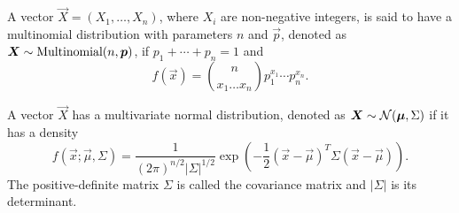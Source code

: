 \documentclass{article}
\begin{document}
\begin{defn}\label{c2d19}
A vector $\vec{X} = (X_1, \ldots, X_n)$, where $X_i$ are non-negative integers,
is said to have a multinomial distribution with parameters $n$ and $\vec{p}$,
denoted as $\bm{X} \sim \text{Multinomial}(n, \bm{p})$, if $p_1 + \cdots + p_n = 1$ and 
\begin{equation}\label{c2e25}
f(\vec{x}) = \binom{n}{x_1 \ldots x_n}p_1^{x_1}\cdots p_n^{x_n}.
\end{equation}
\end{defn}

\begin{defn}\label{c2d20}
A vector $\vec{X}$ has a multivariate normal distribution, denoted as $\bm{X}
\sim \mathcal{N}(\bm{\mu}, \Sigma)$ if it has a density
\begin{equation}\label{c2e26}
f(\vec{x}; \vec{\mu}, \Sigma) = \frac{1}{(2\pi)^{n/2}|\Sigma|^{1/2}}
\exp\left(-\frac{1}{2}(\vec{x} - \vec{\mu})^T\Sigma(\vec{x} - \vec{\mu})\right).
\end{equation}
The positive-definite matrix $\Sigma$ is called the covariance matrix and 
$|\Sigma|$ is its determinant.
\end{defn}
\end{document}
